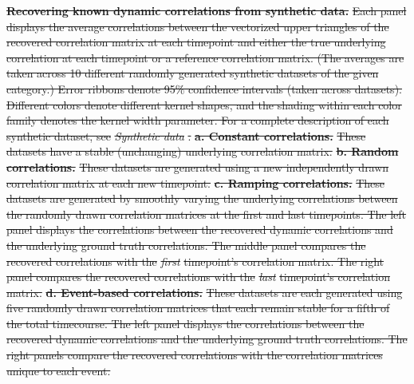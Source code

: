 \documentclass[english]{article}
\providecommand{\DIFdeltex}[1]{{\protect\color{red}\sout{#1}}}                      %
\providecommand{\DIFdelFL}[1]{\DIFdel{#1}} %
\providecommand{\DIFdel}[1]{\texorpdfstring{\DIFdeltex{#1}}{}} %
\begin{document}
{%
\textbf{\DIFdelFL{Recovering known dynamic correlations from
      synthetic data.}}  %
\DIFdelFL{Each panel displays the average correlations
    between the vectorized upper triangles of the recovered
    correlation matrix at each timepoint and either the true
    underlying correlation at each timepoint or a reference
    correlation matrix.  (The averages are taken across 10 different
    randomly generated synthetic datasets of the given category.)
    Error ribbons denote 95\% confidence intervals (taken across
    datasets). Different colors denote different kernel shapes, and
    the shading within each color family denotes the kernel width
    parameter.  For a complete description of each synthetic dataset,
    see }\textit{\DIFdelFL{Synthetic data}}%
\DIFdelFL{.  }\textbf{\DIFdelFL{a. Constant correlations.}}
\DIFdelFL{These datasets have a stable (unchanging) underlying correlation
    matrix.  }\textbf{\DIFdelFL{b. Random correlations.}}  %
\DIFdelFL{These datasets are
    generated using a new independently drawn correlation matrix at
    each new timepoint.  }\textbf{\DIFdelFL{c. Ramping correlations.}}  %
\DIFdelFL{These
    datasets are generated by smoothly varying the underlying
    correlations between the randomly drawn correlation matrices at
    the first and last timepoints.  The left panel displays the
    correlations between the recovered dynamic correlations and the
    underlying ground truth correlations.  The middle panel compares
    the recovered correlations with the }\textit{\DIFdelFL{first}} %
\DIFdelFL{timepoint's
    correlation matrix.  The right panel compares the recovered
    correlations with the }\textit{\DIFdelFL{last}} %
\DIFdelFL{timepoint's correlation
    matrix.  }\textbf{\DIFdelFL{d. Event-based correlations.}}  %
\DIFdelFL{These datasets are
    each generated using five randomly drawn correlation matrices that
    each remain stable for a fifth of the total timecourse.  The left
    panel displays the correlations between the recovered dynamic
    correlations and the underlying ground truth correlations.  The
    right panels compare the recovered correlations with the
    correlation matrices unique to each event.}}
\end{document}
